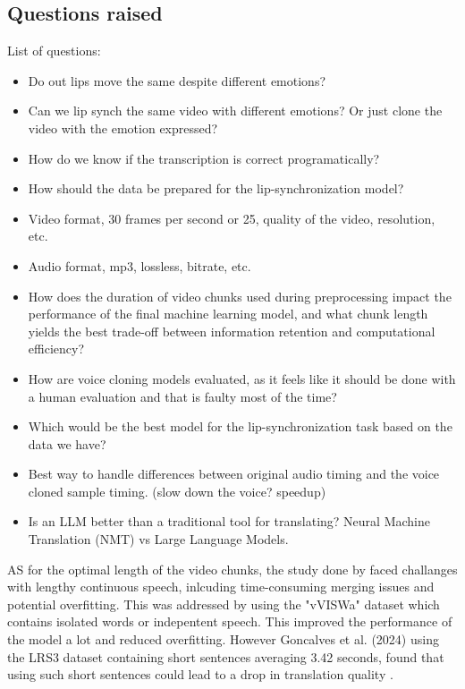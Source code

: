 \documentclass[12pt]{article}
\begin{document}
\subsection{Questions raised}
List of questions:
\begin{itemize}
    \item Do out lips move the same despite different emotions?
    \item Can we lip synch the same video with different emotions? Or just clone the video with the emotion expressed?
    \item How do we know if the transcription is correct programatically?
    \item How should the data be prepared for the lip-synchronization model?
    \item Video format, 30 frames per second or 25, quality of the video, resolution, etc.
    \item Audio format, mp3, lossless, bitrate, etc.
    \item How does the duration of video chunks used during preprocessing impact the performance of the final machine learning model, and what chunk length yields the best trade-off between information retention and computational efficiency?
    \item How are voice cloning models evaluated, as it feels like it should be done with a human evaluation and that is faulty most of the time?
    \item Which would be the best model for the lip-synchronization task based on the data we have?
    \item Best way to handle differences between original audio timing and the voice cloned sample timing. (slow down the voice? speedup)
    \item Is an LLM better than a traditional tool for translating? Neural Machine Translation (NMT) vs Large Language Models.
\end{itemize}
AS for the optimal length of the video chunks, the study done by \cite{PAWAR2024100084} faced challanges with lengthy continuous speech, inlcuding time-consuming merging issues and potential overfitting. This was addressed by using the "vVISWa" dataset which contains isolated words or indepentent speech. This improved the performance of the model a lot and reduced overfitting. However Goncalves et al. (2024) using the LRS3 dataset containing short sentences averaging 3.42 seconds, found that using such short sentences could lead to a drop in translation quality \cite{lipsynchronydirectaudiovisual}.
\end{document}
